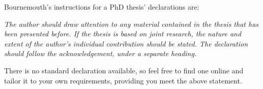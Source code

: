 
\begin{declaration}
Bournemouth's instructions for a PhD thesis' declarations are:

\textit{The author should draw attention to any material contained in the thesis that has been presented before. If the thesis is based on joint research, the nature and extent of the author's individual contribution should be stated. The declaration should follow the acknowledgement, under a separate heading.}

There is no standard declaration available, so feel free to find one online and tailor it to your own requirements, providing you meet the above statement.

\end{declaration}
